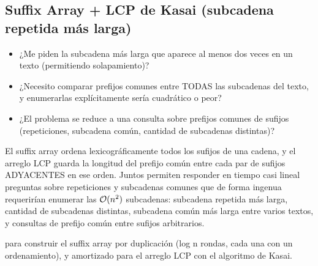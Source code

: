 \subsection{Suffix Array + LCP de Kasai (subcadena repetida más larga)}
\label{alg:9-4}


\begin{itemize}
\item ¿Me piden la subcadena más larga que aparece al menos dos veces en un texto (permitiendo solapamiento)?
\item ¿Necesito comparar prefijos comunes entre TODAS las subcadenas del texto, y enumerarlas explícitamente sería cuadrático o peor?
\item ¿El problema se reduce a una consulta sobre prefijos comunes de sufijos (repeticiones, subcadena común, cantidad de subcadenas distintas)?
\end{itemize}

 El suffix array ordena lexicográficamente todos los sufijos de una cadena, y el arreglo LCP guarda la longitud del prefijo común entre cada par de sufijos ADYACENTES en ese orden. Juntos permiten responder en tiempo casi lineal preguntas sobre repeticiones y subcadenas comunes que de forma ingenua requerirían enumerar las $\mathcal{O}(n^2)$ subcadenas: subcadena repetida más larga, cantidad de subcadenas distintas, subcadena común más larga entre varios textos, y consultas de prefijo común entre sufijos arbitrarios.

  para construir el suffix array por duplicación (log n rondas, cada una con un ordenamiento), y  amortizado para el arreglo LCP con el algoritmo de Kasai.

